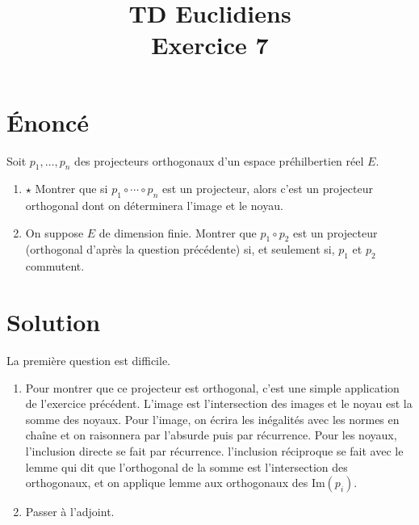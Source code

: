 \documentclass[french]{article}
\title{TD Euclidiens\\ Exercice 7}
\date{}
\newcommand{\im}{\text{Im}}
\begin{document}
\maketitle

\section{Énoncé}
Soit $p_1,\ldots,p_n$ des projecteurs orthogonaux d'un espace préhilbertien réel $E$.
\begin{enumerate}
	\item $\star$ Montrer que si $p_1\circ\cdots\circ p_n$ est un projecteur, alors c'est un projecteur orthogonal dont on déterminera l'image et le noyau.
	\item On suppose $E$ de dimension finie. Montrer que $p_1\circ p_2$ est un projecteur (orthogonal d'après la question précédente) si, et seulement si, $p_1$ et $p_2$ commutent.
\end{enumerate}

\section{Solution}
La première question est difficile.
\begin{enumerate}
	\item Pour montrer que ce projecteur est orthogonal, c'est une simple application de l'exercice précédent. L'image est l'intersection des images et le noyau est la somme des noyaux. Pour l'image, on écrira les inégalités avec les normes en chaîne et on raisonnera par l'absurde puis par récurrence. Pour les noyaux, l'inclusion directe se fait par récurrence. l'inclusion réciproque se fait avec le lemme qui dit que l'orthogonal de la somme est l'intersection des orthogonaux, et on applique lemme aux orthogonaux des $\im(p_i)$.
	\item Passer à l'adjoint.
\end{enumerate}
\end{document}
